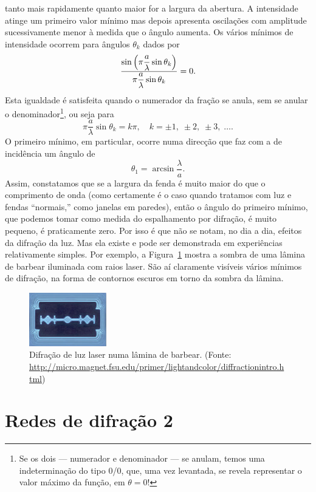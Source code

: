 tanto mais rapidamente quanto maior for a largura da abertura. A intensidade
atinge um primeiro valor mínimo mas depois apresenta oscilações com amplitude
sucessivamente menor à medida que o ângulo aumenta. Os vários mínimos de
intensidade ocorrem para ângulos $\theta_k$ dados por
\begin{equation*}
    \frac{\displaystyle%
    \sin\left(\pi\frac a \lambda \sin\theta_k\right)}{%
    \displaystyle \pi\frac a \lambda \sin\theta_k}=0.
\end{equation*}
Esta igualdade é satisfeita quando o numerador da fração se anula, sem se anular
o denominador\footnote{Se os dois --- numerador e denominador --- se anulam,
temos uma indeterminação do tipo 0/0, que, uma vez levantada, se revela
representar o valor máximo da função, em $\theta=0$!}, ou seja para
\begin{equation*}
    \pi \frac a \lambda\sin\theta_k=k\pi,\quad k=\pm1,\;\pm2,\;\pm3,\;\ldots.
\end{equation*}
O primeiro mínimo, em particular, ocorre numa direcção que faz com a de
incidência um ângulo de 
\begin{equation*}
    \theta_1 = \arcsin\frac{\lambda}{a}.
\end{equation*}
Assim, constatamos que se a largura da fenda é muito maior do que o comprimento
de onda (como certamente é o caso quando tratamos com luz e fendas ``normais,''
como janelas em paredes), então o ângulo do primeiro mínimo, que podemos tomar
como medida do espalhamento por difração, é muito pequeno, é praticamente zero.
Por isso é que não se notam, no dia a dia, efeitos da difração da luz. Mas ela
existe e pode ser demonstrada em experiências relativamente simples. Por
exemplo, a Figura~\ref{fig:40-080} mostra a sombra de uma lâmina de barbear
iluminada com raios laser. São aí claramente visíveis vários mínimos de
difração, na forma de contornos escuros em torno da sombra da lâmina.
\begin{figure}[htb]
    \begin{center}
        \includegraphics[width=0.3\textwidth]{figs/f40-080.jpg}
    \end{center}
    \caption{Difração de luz laser numa lâmina de barbear. (Fonte:
        \protect%
        \url{http://micro.magnet.fsu.edu/primer/lightandcolor/diffractionintro.html})%
    \label{fig:40-080}}
\end{figure}

\section{Redes de difração 2}
\tobedone{}


